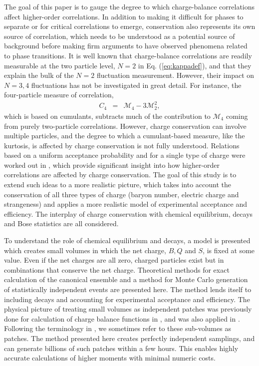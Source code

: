 The goal of this paper is to gauge the degree to which charge-balance correlations affect higher-order correlations. In addition to making it difficult for phases to separate or for critical correlations to emerge, conservation also represents its own source of correlation, which needs to be understood as a potential source of background before making firm arguments to have observed phenomena related to phase transitions. It is well known that charge-balance correlations are readily measurable at the two particle level, $N=2$ in Eq. (\ref{eq:kappadef}), and that they explain the bulk of the $N=2$ fluctuation measurement. However, their impact on $N=3,4$ fluctuations has not be investigated in great detail. For instance, the four-particle measure of correlation,
\begin{eqnarray}
C_4&=&\mathcal{M}_4-3\mathcal{M}_2^2,
\end{eqnarray}
which is based on cumulants, subtracts much of the contribution to $\mathcal{M}_4$ coming from purely two-particle correlations. However, charge conservation can involve multiple particles, and the degree to which a cumulant-based measure, like the kurtosis, is affected by charge conservation is not fully understood. Relations based on a uniform acceptance probability and for a single type of charge were worked out in \cite{Savchuk:2019xfg}, which provide significant insight into how higher-order correlations are affected by charge conservation. The goal of this study is to extend such ideas to a more realistic picture, which takes into account the conservation of all three types of charge (baryon number, electric charge and strangeness) and applies a more realistic model of experimental acceptance and efficiency. The interplay of charge conservation with chemical equilibrium, decays and Bose statistics are all considered.

To understand the role of chemical equilibrium and decays, a model is presented which creates small volumes in which the net charge, $B,Q$ and $S$, is fixed at some value. Even if the net charges are all zero, charged particles exist but in combinations that conserve the net charge. Theoretical methods for exact calculation of the canonical ensemble and a method for Monte Carlo generation of statistically independent events are presented here. The method lends itself to including decays and accounting for experimental acceptance and efficiency. The physical picture of treating small volumes as independent patches was previously done for calculation of charge balance functions in \cite{Schlichting:2010qia,Schlichting:2010na}, and was also applied in \cite{Oliinychenko:2020cmr}. Following the terminology in \cite{Oliinychenko:2020cmr}, we sometimes refer to these sub-volumes as patches. The method presented here creates perfectly independent samplings, and can generate billions of such patches within a few hours. This enables highly accurate calculations of higher moments with minimal numeric costs.

